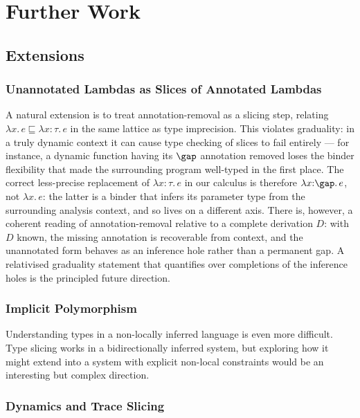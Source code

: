 \section{Further Work}
\label{sec:further-work}

\subsection{Extensions}

\subsubsection{Unannotated Lambdas as Slices of Annotated Lambdas}
\label{sec:fw-unannot-lambdas}

A natural extension is to treat annotation-removal as a slicing step, relating $\lambda x.\,e \sqsubseteq \lambda x{:}\tau.\,e$ in the same lattice as type imprecision. This violates graduality: in a truly dynamic context it can cause type checking of slices to fail entirely --- for instance, a dynamic function having its $\gap$ annotation removed loses the binder flexibility that made the surrounding program well-typed in the first place. The correct less-precise replacement of $\lambda x{:}\tau.\,e$ in our calculus is therefore $\lambda x{:}\gap.\,e$, not $\lambda x.\,e$: the latter is a binder that infers its parameter type from the surrounding analysis context, and so lives on a different axis. There is, however, a coherent reading of annotation-removal relative to a complete derivation $D$: with $D$ known, the missing annotation is recoverable from context, and the unannotated form behaves as an inference hole rather than a permanent gap. A relativised graduality statement that quantifies over completions of the inference holes is the principled future direction.

\subsubsection{Implicit Polymorphism}
\label{sec:fw-implicit-poly}

Understanding types in a non-locally inferred language is even more difficult. Type slicing works in a bidirectionally inferred system, but exploring how it might extend into a system with explicit non-local constraints would be an interesting but complex direction.

\subsubsection{Dynamics and Trace Slicing}
\label{sec:fw-dynamics-trace}


